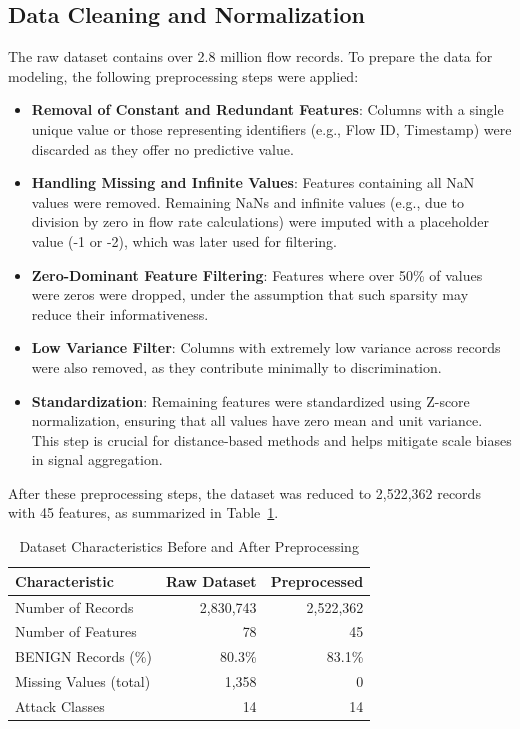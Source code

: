 \documentclass[conference]{IEEEtran}
\begin{document}
\subsection{Data Cleaning and Normalization}

The raw dataset contains over 2.8 million flow records. To prepare
the data for modeling, the following preprocessing steps were applied:

\begin{itemize}
  \item \textbf{Removal of Constant and Redundant Features}: Columns
    with a single unique value or those representing identifiers
    (e.g., Flow ID, Timestamp) were discarded as they offer no
    predictive value.

  \item \textbf{Handling Missing and Infinite Values}: Features
    containing all NaN values were removed. Remaining NaNs and
    infinite values (e.g., due to division by zero in flow rate
    calculations) were imputed with a placeholder value (-1 or -2),
    which was later used for filtering.

  \item \textbf{Zero-Dominant Feature Filtering}: Features where over
    50\% of values were zeros were dropped, under the assumption that
    such sparsity may reduce their informativeness.

  \item \textbf{Low Variance Filter}: Columns with extremely low
    variance across records were also removed, as they contribute
    minimally to discrimination.

  \item \textbf{Standardization}: Remaining features were
    standardized using Z-score normalization, ensuring that all
    values have zero mean and unit variance. This step is crucial for
    distance-based methods and helps mitigate scale biases in signal
    aggregation.
\end{itemize}

After these preprocessing steps, the dataset was reduced to 2,522,362 records
with 45 features, as summarized in Table~\ref{tab:dataset_summary}.

\begin{table}[h]
  \centering
  \caption{Dataset Characteristics Before and After Preprocessing}
  \label{tab:dataset_summary}
  \begin{tabular}{lrr}
    \toprule
    \textbf{Characteristic} & \textbf{Raw Dataset} & \textbf{Preprocessed} \\
    \midrule
    Number of Records & 2,830,743 & 2,522,362 \\
    Number of Features & 78 & 45 \\
    BENIGN Records (\%) & 80.3\% & 83.1\% \\
    Missing Values (total) & 1,358 & 0 \\
    Attack Classes & 14 & 14 \\
    \bottomrule
  \end{tabular}
\end{table}
\end{document}
